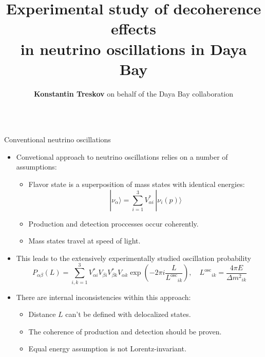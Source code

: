 \documentclass[usenames, dvipsnames]{beamer}
\author[]{\textbf{Konstantin Treskov} on behalf of the Daya Bay collaboration}
\title{Experimental study of decoherence effects\\ in neutrino oscillations in
Daya Bay}
\institute{Joint Institute for Nuclear Research, Dubna, Russia}
\newcommand{\Losc}{\ensuremath{L^{\text{osc}}}}
\newcommand{\Dm}{\ensuremath{\Delta m^2}}
\newcommand{\Important}{\textcolor{BrickRed}}
\newcommand{\Regular}{\textcolor{DeepBlue}}
\newcommand{\regitem}{\item[\Regular{$\bullet$}]}
\newcommand{\impitem}{\item[\Important{$\bullet$}]}
\begin{document}
\begin{frame}[fragile]
\begin{columns}[T]

    \hspace*{-2.5cm}
\begin{column}{.47\textwidth}
\begin{block}{Conventional neutrino oscillations}
\begin{itemize}
    \regitem Convetional approach to neutrino oscillations relies on a number of
        assumptions:
        \begin{itemize}
            \item Flavor state is a superposition of mass states with
                identical energies:
                \begin{equation*}
                    | \nu_\alpha \rangle = \sum_{i=1}^{3} V^*_{\alpha i}\, |
                    \nu_i(p) \rangle
                \end{equation*}
            \item Production and detection proccesses occur coherently.
            \item Mass states travel at speed of light.
        \end{itemize}
    \item This leads to the extensively experimentally studied oscillation probability
    \begin{equation*}
        P_{\alpha\beta}(L) = \sum_{i,k=1}^3 V^*_{\alpha i} V_{\beta i}
        V^*_{\beta k}
        V_{\alpha k} \exp \left( - 2\pi i  \frac{L}{\Losc_{ik}}\right), \quad
        \ensuremath{\Losc_{ik} = \dfrac{4 \pi E}{\Dm_{ik}}}
    \end{equation*}
    \impitem There are internal inconsistencies within this approach:
        \begin{itemize}
            \item  Distance \ensuremath{L} can't be defined with delocalized
                states.
            \item The coherence of production and detection should be proven.
            \item Equal energy assumption is not Lorentz-invariant.
        \end{itemize}
\end{itemize}
\end{block}


\end{column}
\end{columns}
\end{frame}
\end{document}
